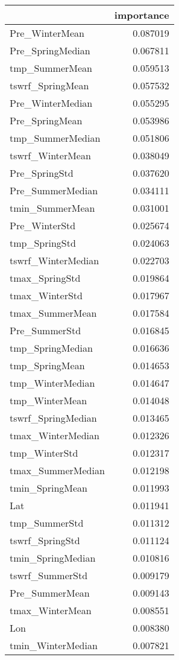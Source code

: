 \begin{tabular}{lr}
\toprule
 & importance \\
\midrule
Pre_WinterMean & 0.087019 \\
Pre_SpringMedian & 0.067811 \\
tmp_SummerMean & 0.059513 \\
tswrf_SpringMean & 0.057532 \\
Pre_WinterMedian & 0.055295 \\
Pre_SpringMean & 0.053986 \\
tmp_SummerMedian & 0.051806 \\
tswrf_WinterMean & 0.038049 \\
Pre_SpringStd & 0.037620 \\
Pre_SummerMedian & 0.034111 \\
tmin_SummerMean & 0.031001 \\
Pre_WinterStd & 0.025674 \\
tmp_SpringStd & 0.024063 \\
tswrf_WinterMedian & 0.022703 \\
tmax_SpringStd & 0.019864 \\
tmax_WinterStd & 0.017967 \\
tmax_SummerMean & 0.017584 \\
Pre_SummerStd & 0.016845 \\
tmp_SpringMedian & 0.016636 \\
tmp_SpringMean & 0.014653 \\
tmp_WinterMedian & 0.014647 \\
tmp_WinterMean & 0.014048 \\
tswrf_SpringMedian & 0.013465 \\
tmax_WinterMedian & 0.012326 \\
tmp_WinterStd & 0.012317 \\
tmax_SummerMedian & 0.012198 \\
tmin_SpringMean & 0.011993 \\
Lat & 0.011941 \\
tmp_SummerStd & 0.011312 \\
tswrf_SpringStd & 0.011124 \\
tmin_SpringMedian & 0.010816 \\
tswrf_SummerStd & 0.009179 \\
Pre_SummerMean & 0.009143 \\
tmax_WinterMean & 0.008551 \\
Lon & 0.008380 \\
tmin_WinterMedian & 0.007821 \\

\end{tabular}
